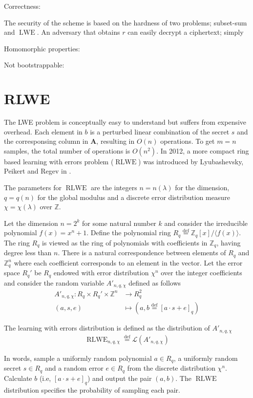 Correctness:

The security of the scheme is based on the hardness of two problems; subset-sum and $\operatorname{LWE}$. An adversary that obtains $r$ can easily decrypt a ciphertext; simply  

Homomorphic properties:

Not bootstrappable:

\section{RLWE}
The LWE problem is conceptually easy to understand but suffers from expensive overhead. Each element in $b$ is a perturbed linear combination of the secret $s$ and the corresponsing column in $\textbf{A}$, resulting in $O(n)$ operations. To get $m = n$ samples, the total number of operations is $O(n^2)$. In 2012, a more compact ring based learning with errors problem ($\operatorname{RLWE}$) was introduced by Lyubashevsky, Peikert and Regev in \cite{RLWE}.

The parameters for $\operatorname{RLWE}$ are the integers $n = n(\lambda)$ for the dimension, $q = q(n)$ for the global modulus and a discrete error distribution measure $\chi = \chi(\lambda)$ over $\mathbb{Z}$.

Let the dimension $n = 2^k$ for some natural number $k$ and consider the irreducible polynomial $f(x) = x^n + 1$. Define the polynomial ring $R_q \stackrel{\mathrm{def}}{=} \mathbb{Z}_q[x] /\langle f(x)\rangle$. The ring $R_q$ is viewed as the ring of polynomials with coefficients in $\mathbb{Z}_q$, having degree less than $n$. There is a natural correspondence between elements of $R_q$ and $\mathbb{Z}_q^n$ where each coefficient corresponds to an element in the vector. Let the error space $R_q'$ be $R_q$ endowed with error distribution $\chi^n$ over the integer coefficients and consider the random variable $A'_{n, q, \chi}$ defined as follows
\begin{equation*}
\begin{aligned}
    A'_{n, q, \chi} \colon R_q \times R_q' \times \mathbb{Z}^n &\to R_q^2\\
    (a,s,e) &\mapsto (a, b \stackrel{\mathrm{def}}{=} [a \cdot s + e]_q)
\end{aligned}
\end{equation*}
\begin{definition}
    The learning with errors distribution is defined as the distribution of $A'_{n, q, \chi}$
    \begin{equation*}
    \begin{aligned}
        \operatorname{RLWE}_{n, q, \chi} \stackrel{\mathrm{def}}{=} \mathcal{L}(A'_{n, q, \chi})
    \end{aligned}
    \end{equation*}
\end{definition}
In words, sample a uniformly random polynomial $a \in R_q$, a uniformly random secret $s \in R_q$ and a random error $e \in R_q$ from the discrete distribution $\chi^n$. Calculate $b$ (i.e, $[a \cdot s + e]_q$) and output the pair $(a,b)$. The $\operatorname{RLWE}$ distribution specifies the probability of sampling each pair.

